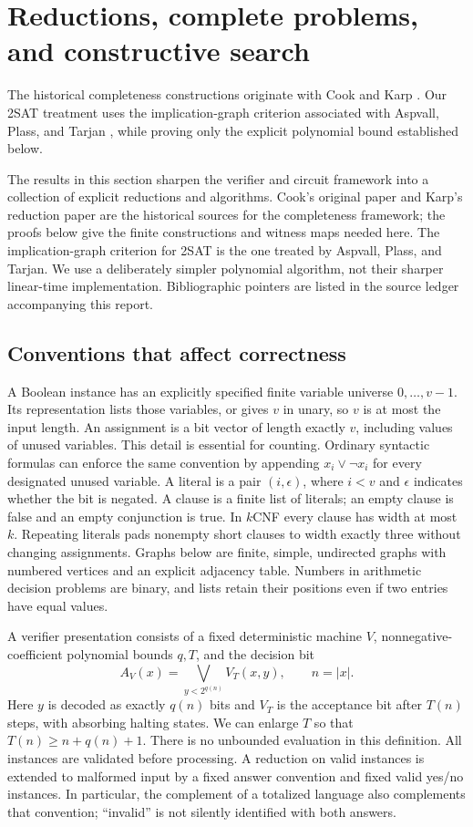 \section{Reductions, complete problems, and constructive search}\label{sec:np}

The historical completeness constructions originate with Cook and Karp \cite{Cook1971,Karp1972}. Our 2SAT treatment uses the implication-graph criterion associated with Aspvall, Plass, and Tarjan \cite{AspvallPlassTarjan1979}, while proving only the explicit polynomial bound established below.

The results in this section sharpen the verifier and circuit framework into a
collection of explicit reductions and algorithms. Cook's original paper and
Karp's reduction paper are the historical sources for the completeness
framework; the proofs below give the finite constructions and witness maps
needed here. The implication-graph criterion for 2SAT is the one treated by
Aspvall, Plass, and Tarjan. We use a deliberately simpler polynomial algorithm,
not their sharper linear-time implementation. Bibliographic pointers are
listed in the source ledger accompanying this report.

\subsection{Conventions that affect correctness}

A Boolean instance has an explicitly specified finite variable universe
$0,\ldots,v-1$. Its representation lists those variables, or gives $v$ in
unary, so $v$ is at most the input length. An assignment is a bit vector of
length exactly $v$, including values of unused variables. This detail is
essential for counting. Ordinary syntactic formulas can enforce the same
convention by appending $x_i\vee\neg x_i$ for every designated unused variable.
A literal is a pair $(i,\epsilon)$, where $i<v$ and $\epsilon$ indicates whether
the bit is negated. A clause is a finite list of literals; an empty clause is
false and an empty conjunction is true. In $k$CNF every clause has width at
most $k$. Repeating literals pads nonempty short clauses to width exactly
three without changing assignments. Graphs below are finite, simple,
undirected graphs with numbered vertices and an explicit adjacency table.
Numbers in arithmetic decision problems are binary, and lists retain their
positions even if two entries have equal values.

A verifier presentation consists of a fixed deterministic machine $V$,
nonnegative-coefficient polynomial bounds $q,T$, and the decision bit
\[
 A_V(x)=\bigvee_{y<2^{q(n)}} V_T(x,y),\qquad n=|x|.
\]
Here $y$ is decoded as exactly $q(n)$ bits and $V_T$ is the acceptance bit after
$T(n)$ steps, with absorbing halting states. We can enlarge $T$ so that
$T(n)\ge n+q(n)+1$. There is no unbounded evaluation in this definition.
All instances are validated before processing. A reduction on valid instances
is extended to malformed input by a fixed answer convention and fixed valid
yes/no instances. In particular, the complement of a totalized language also
complements that convention; ``invalid'' is not silently identified with both
answers.

